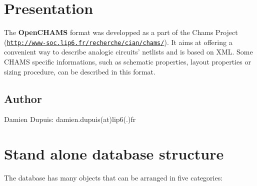 \hypertarget{openchams_openChamsPres}{}\section{Presentation}\label{openchams_openChamsPres}
The {\bfseries Open\-C\-H\-A\-M\-S} format was developped as a part of the Chams Project (\href{http://www-soc.lip6.fr/recherche/cian/chams/}{\tt http\-://www-\/soc.\-lip6.\-fr/recherche/cian/chams/}). It aims at offering a convenient way to describe analogic circuits' netlists and is based on X\-M\-L. Some C\-H\-A\-M\-S specific informations, such as schematic properties, layout properties or sizing procedure, can be described in this format.\par
 \hypertarget{openchams_openChamsAutrhos}{}\subsection{Author}\label{openchams_openChamsAutrhos}
Damien Dupuis\-: damien.\-dupuis(at)lip6(.)fr\hypertarget{openchams_openChamsDB}{}\section{Stand alone database structure}\label{openchams_openChamsDB}
The database has many objects that can be arranged in five categories\-:
